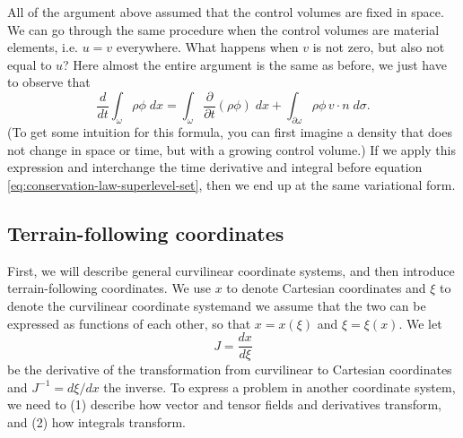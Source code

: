 \documentclass{article}
\theoremstyle{definition}
\theoremstyle{plain}
\begin{document}
All of the argument above assumed that the control volumes are fixed in space.
We can go through the same procedure when the control volumes are material elements, i.e. $u = v$ everywhere.
What happens when $v$ is not zero, but also not equal to $u$?
Here almost the entire argument is the same as before, we just have to observe that
\begin{equation}
    \frac{d}{dt}\int_\omega\rho\phi\;dx = \int_\omega\frac{\partial}{\partial t}(\rho\phi)\;dx + \int_{\partial\omega}\rho\phi\,v\cdot n\;d\sigma.
\end{equation}
(To get some intuition for this formula, you can first imagine a density that does not change in space or time, but with a growing control volume.)
If we apply this expression and interchange the time derivative and integral before equation \eqref{eq:conservation-law-superlevel-set}, then we end up at the same variational form.


\subsection{Terrain-following coordinates}

First, we will describe general curvilinear coordinate systems, and then introduce terrain-following coordinates.
We use $x$ to denote Cartesian coordinates and $\xi$ to denote the curvilinear coordinate systemand we assume that the two can be expressed as functions of each other, so that $x = x(\xi)$ and $\xi = \xi(x)$.
We let
\begin{equation}
    J = \frac{dx}{d\xi}
\end{equation}
be the derivative of the transformation from curvilinear to Cartesian coordinates and $J^{-1} = d\xi/dx$ the inverse.
To express a problem in another coordinate system, we need to (1) describe how vector and tensor fields and derivatives transform, and (2) how integrals transform.
\end{document}
